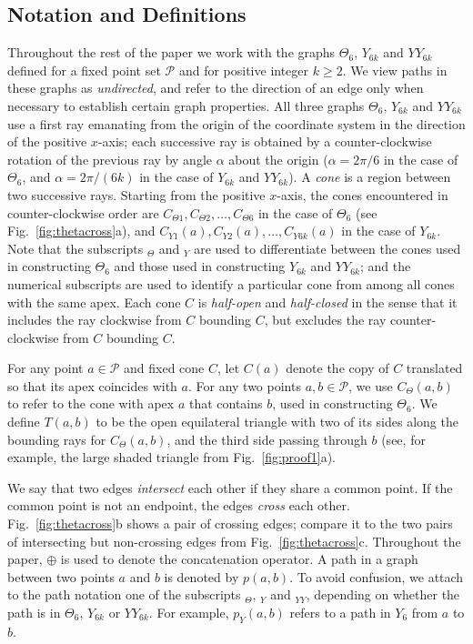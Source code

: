 \documentclass[11pt]{article}
\newcommand\cone{{C}}
\newcommand\Pt{\mathcal P}
\begin{document}
\subsection{Notation and Definitions}
Throughout the rest of the paper we work with the graphs $\Theta_6$, $Y_{6k}$ and $YY_{6k}$ defined for a fixed point set $\Pt$ and for positive integer $k \ge 2$. We view paths in these graphs as \emph{undirected}, and refer to the direction of an edge only when necessary to establish certain graph properties.
All three graphs $\Theta_6$, $Y_{6k}$ and $YY_{6k}$ use a first ray emanating from the origin of the coordinate system in the direction of the positive $x$-axis; each successive ray is obtained by a counter-clockwise rotation of the previous ray by angle $\alpha$ about the origin ($\alpha = 2\pi/6$ in the case of $\Theta_6$, and $\alpha = 2\pi/(6k)$ in the case of $Y_{6k}$ and $YY_{6k}$). A \emph{cone} is a region between two successive rays. Starting from the positive $x$-axis, the cones encountered in counter-clockwise order are $\cone_{\Theta1}, \cone_{\Theta2}, \ldots, \cone_{\Theta6}$ in the case of $\Theta_6$ (see Fig.~\ref{fig:thetacross}a), and $\cone_{Y1}(a), \cone_{Y2}(a), \ldots, \cone_{Y6k}(a)$ in the case of $Y_{6k}$. Note that the subscripts $_\Theta$ and $_Y$ are used to differentiate between the cones used in constructing $\Theta_6$ and those used in constructing $Y_{6k}$ and $YY_{6k}$; and the numerical subscripts are used to identify a particular cone from among all cones with the same apex.
Each cone $\cone$ is \emph{half-open} and \emph{half-closed} in the sense that it includes the ray clockwise from $\cone$ bounding $\cone$, but excludes the ray counter-clockwise from $\cone$ bounding $\cone$.

For any point $a \in \Pt$ and fixed cone $\cone$, let $\cone(a)$ denote the copy of $\cone$ translated so that its apex coincides with $a$.
For any two points $a, b \in \Pt$, we use $\cone_\Theta(a, b)$ to refer to the cone with apex $a$ that contains $b$, used in constructing $\Theta_6$.
We define $T(a, b)$ to be the open equilateral triangle with two of its sides along the
bounding rays for $\cone_\Theta(a, b)$, and the third side passing through $b$ (see, for example, the large shaded
triangle from Fig.~\ref{fig:proof1}a).

We say that two edges \emph{intersect} each other if they share a common point. If the common point is not an endpoint, the edges \emph{cross} each other. Fig.~\ref{fig:thetacross}b shows a pair of crossing edges; compare it to the two pairs of intersecting but non-crossing edges from Fig.~\ref{fig:thetacross}c. Throughout the paper, $\oplus$ is used to denote the
concatenation operator. A path in a graph between two points $a$ and $b$ is denoted by $p(a, b)$. To avoid confusion, we attach to the path notation one of the subscripts $_\Theta$, $_Y$ and $_{YY}$, depending on whether the path is in $\Theta_6$, $Y_{6k}$ or $YY_{6k}$. For example, $p_Y(a, b)$ refers to a path in $Y_6$ from $a$ to $b$.
\end{document}
